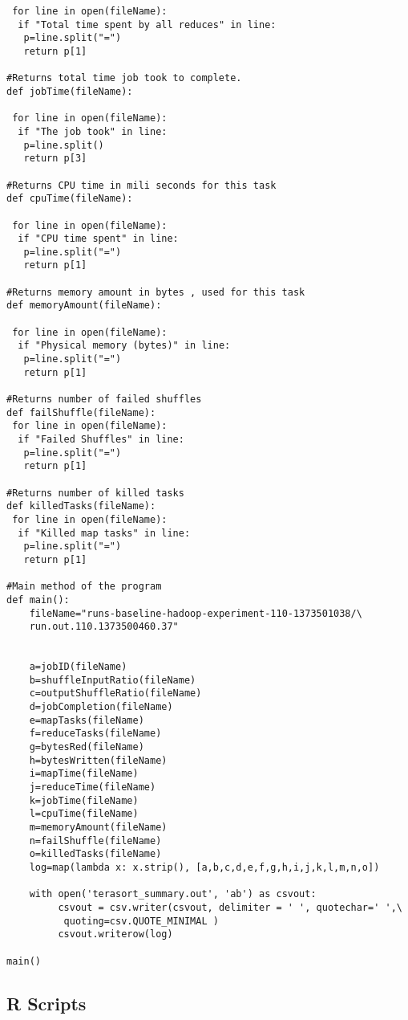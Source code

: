\begin{verbatim}
 for line in open(fileName):
  if "Total time spent by all reduces" in line:
   p=line.split("=")
   return p[1]

#Returns total time job took to complete. 
def jobTime(fileName):

 for line in open(fileName):
  if "The job took" in line:
   p=line.split()
   return p[3]

#Returns CPU time in mili seconds for this task
def cpuTime(fileName):

 for line in open(fileName):
  if "CPU time spent" in line:
   p=line.split("=")
   return p[1]

#Returns memory amount in bytes , used for this task
def memoryAmount(fileName):

 for line in open(fileName):
  if "Physical memory (bytes)" in line:
   p=line.split("=")
   return p[1]

#Returns number of failed shuffles
def failShuffle(fileName):
 for line in open(fileName):
  if "Failed Shuffles" in line:
   p=line.split("=")
   return p[1]

#Returns number of killed tasks
def killedTasks(fileName):
 for line in open(fileName):
  if "Killed map tasks" in line:
   p=line.split("=")
   return p[1]

#Main method of the program
def main():
    fileName="runs-baseline-hadoop-experiment-110-1373501038/\
    run.out.110.1373500460.37"
  
   
    a=jobID(fileName)
    b=shuffleInputRatio(fileName)
    c=outputShuffleRatio(fileName)
    d=jobCompletion(fileName)
    e=mapTasks(fileName)
    f=reduceTasks(fileName)
    g=bytesRed(fileName)
    h=bytesWritten(fileName)
    i=mapTime(fileName)
    j=reduceTime(fileName)
    k=jobTime(fileName)
    l=cpuTime(fileName)
    m=memoryAmount(fileName)
    n=failShuffle(fileName)
    o=killedTasks(fileName)
    log=map(lambda x: x.strip(), [a,b,c,d,e,f,g,h,i,j,k,l,m,n,o])
   
    with open('terasort_summary.out', 'ab') as csvout:
         csvout = csv.writer(csvout, delimiter = ' ', quotechar=' ',\
          quoting=csv.QUOTE_MINIMAL )
         csvout.writerow(log)
  
main()

\end{verbatim}


\subsection{R Scripts}

